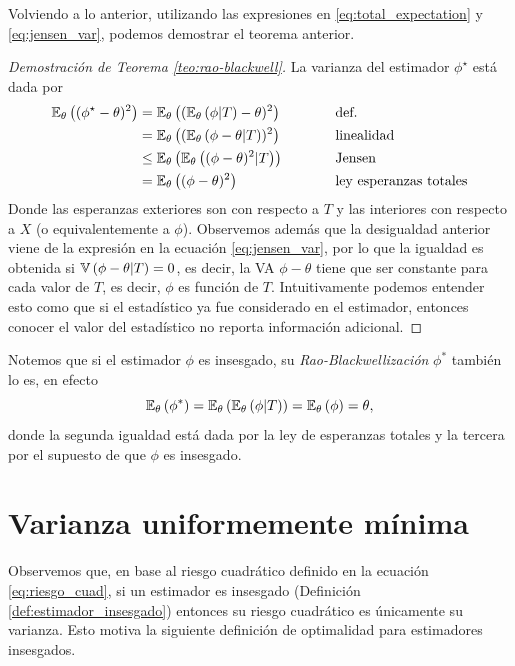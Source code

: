Volviendo a lo anterior, utilizando las expresiones en \eqref{eq:total_expectation} y \eqref{eq:jensen_var}, podemos demostrar el teorema anterior.

 \begin{proof}[Demostración de Teorema \ref{teo:rao-blackwell}]
 	La varianza del estimador $\phi^\star$ está dada por 
 	\begin{alignat*}{2}
 		\mathbb{E}_\theta \left((\phi^\star-\theta)^2\right) &= \mathbb{E}_\theta \left((\mathbb{E}_\theta \left(\phi|T\right)-\theta)^2\right) \quad\quad\quad &&\text{def.}\\
 								&= \mathbb{E}_\theta \left((\mathbb{E}_\theta \left(\phi-\theta|T\right))^2\right)&& \text{linealidad}\\
 								&\leq \mathbb{E}_\theta \left(\mathbb{E}_\theta \left((\phi-\theta)^2|T\right)\right)&& \text{Jensen}\\
 								&= \mathbb{E}_\theta \left((\phi-\theta)^2\right) &&\text{ley esperanzas totales}
 	\end{alignat*}
Donde las esperanzas exteriores son con respecto a $T$ y las interiores con respecto a $X$ (o equivalentemente a $\phi$).  Observemos además que la desigualdad anterior viene de la expresión en la ecuación \eqref{eq:jensen_var}, por lo que la igualdad es obtenida si $\mathbb{V} \left(\phi-\theta|T\right) = 0$, es decir, la VA $\phi-\theta$ tiene que ser constante para cada valor de $T$, es decir, $\phi$ es función de $T$. Intuitivamente podemos entender esto como que si el estadístico ya fue considerado en el estimador, entonces conocer el valor del estadístico no reporta información adicional. 
 \end{proof}

\begin{remark}
	Notemos que si el estimador $\phi$ es insesgado, su \textit{Rao-Blackwellización} $\phi^*$ también lo es, en efecto
	\begin{equation}
		\mathbb{E}_\theta \left(\phi^*\right) = \mathbb{E}_\theta \left(\mathbb{E}_\theta \left(\phi|T\right)\right) = \mathbb{E}_\theta \left(\phi\right) = \theta,
	\end{equation}
	donde la segunda igualdad está dada por la ley de esperanzas totales y la tercera por el supuesto de que $\phi$ es insesgado.
\end{remark}

\section{Varianza uniformemente mínima}

Observemos que, en base al riesgo cuadrático definido en la ecuación \eqref{eq:riesgo_cuad}, si un estimador es insesgado (Definición \ref{def:estimador_insesgado}) entonces su riesgo cuadrático es únicamente su varianza. Esto motiva la siguiente definición de optimalidad para estimadores insesgados. 


